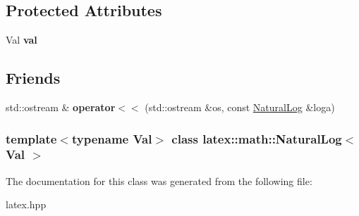 \subsection*{\-Protected \-Attributes}
\begin{DoxyCompactItemize}
\item 
\hypertarget{classlatex_1_1math_1_1NaturalLog_a46cee76970936d26daf87e8c3ec4c47b}{\-Val {\bfseries val}}\label{classlatex_1_1math_1_1NaturalLog_a46cee76970936d26daf87e8c3ec4c47b}

\end{DoxyCompactItemize}
\subsection*{\-Friends}
\begin{DoxyCompactItemize}
\item 
\hypertarget{classlatex_1_1math_1_1NaturalLog_a5151466531baf2bea2fc1928e34cb084}{std\-::ostream \& {\bfseries operator$<$$<$} (std\-::ostream \&os, const \hyperlink{classlatex_1_1math_1_1NaturalLog}{\-Natural\-Log} \&loga)}\label{classlatex_1_1math_1_1NaturalLog_a5151466531baf2bea2fc1928e34cb084}

\end{DoxyCompactItemize}
\subsubsection*{template$<$typename \-Val$>$ class latex\-::math\-::\-Natural\-Log$<$ Val $>$}



\-The documentation for this class was generated from the following file\-:\begin{DoxyCompactItemize}
\item 
latex.\-hpp\end{DoxyCompactItemize}
